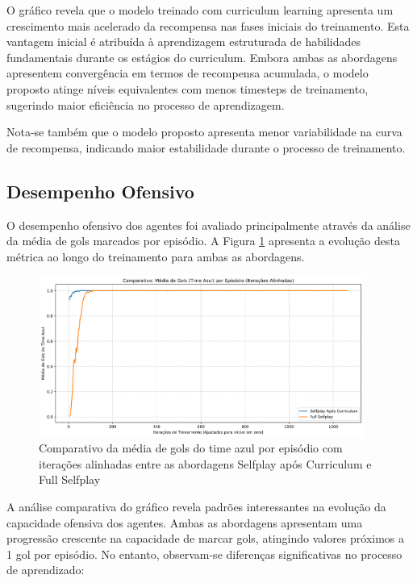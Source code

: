 O gráfico revela que o modelo treinado com curriculum learning apresenta um crescimento mais acelerado da recompensa nas fases iniciais do treinamento. Esta vantagem inicial é atribuída à aprendizagem estruturada de habilidades fundamentais durante os estágios do curriculum. Embora ambas as abordagens apresentem convergência em termos de recompensa acumulada, o modelo proposto atinge níveis equivalentes com menos timesteps de treinamento, sugerindo maior eficiência no processo de aprendizagem.

Nota-se também que o modelo proposto apresenta menor variabilidade na curva de recompensa, indicando maior estabilidade durante o processo de treinamento.

\subsection{Desempenho Ofensivo}

O desempenho ofensivo dos agentes foi avaliado principalmente através da análise da média de gols marcados por episódio. A Figura \ref{fig:goals_blue_comparison} apresenta a evolução desta métrica ao longo do treinamento para ambas as abordagens.

\begin{figure}[H]
    \centering
    \includegraphics[width=0.95\textwidth]{fig/graficos_trabalho/graficos_experimentos/geral/comparativo_gols_azul_alinhado.png}
    \caption{Comparativo da média de gols do time azul por episódio com iterações alinhadas entre as abordagens Selfplay após Curriculum e Full Selfplay}
    \label{fig:goals_blue_comparison}
\end{figure}

A análise comparativa do gráfico revela padrões interessantes na evolução da capacidade ofensiva dos agentes. Ambas as abordagens apresentam uma progressão crescente na capacidade de marcar gols, atingindo valores próximos a 1 gol por episódio. No entanto, observam-se diferenças significativas no processo de aprendizado:

